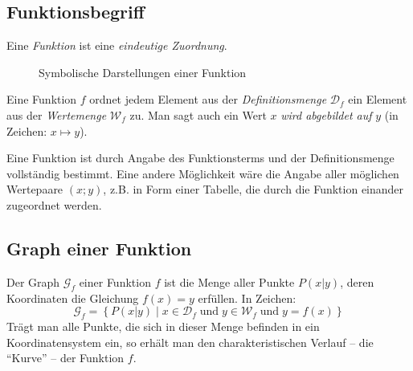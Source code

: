 \subsection{Funktionsbegriff}
\begin{defi}[Funktion]
Eine \emph{Funktion} ist eine \emph{eindeutige Zuordnung}.
 \begin{figure}
 \begin{center}
\end{center}
\caption{Symbolische Darstellungen einer Funktion}
 \end{figure}
 
Eine Funktion \(f\) ordnet jedem Element aus der \emph{Definitionsmenge} \(\mathcal{D}_f\) ein Element aus der \emph{Wertemenge} \(\mathcal{W}_f\) zu. Man sagt auch ein Wert \(x\) \emph{wird abgebildet auf} \(y\) (in Zeichen: \(x\mapsto y\)).

Eine Funktion ist durch Angabe des Funktionsterms und der Definitionsmenge vollständig bestimmt. Eine andere Möglichkeit wäre die Angabe aller möglichen Wertepaare \((x;y)\), z.B. in Form einer Tabelle, die durch die Funktion einander zugeordnet werden.
\end{defi}


\subsection{Graph einer Funktion}

\begin{defi}[Funktionsgraph]
 Der Graph \(\mathcal{G}_f\) einer Funktion \(f\) ist die Menge aller Punkte \(P (x\vert y)\), deren Koordinaten die Gleichung 
  \(f(x) =y\)
 erfüllen.
 In Zeichen: 
 \begin{equation*}
  \mathcal{G}_f = \left\lbrace P(x\vert y) \mid x \in \mathcal{D}_f \;\text{und}\; y \in \mathcal{W}_f \;\text{und}\; y=f(x)\right\rbrace
 \end{equation*}
 Trägt man alle Punkte, die sich in dieser Menge befinden in ein Koordinatensystem ein, so erhält man den charakteristischen Verlauf -- die "`Kurve"' -- der Funktion \(f\).
\end{defi}

